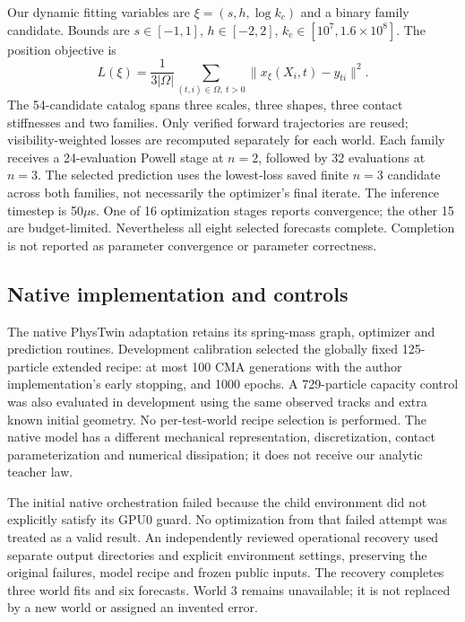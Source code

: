 \documentclass[10pt,twocolumn,letterpaper]{article}
\begin{document}
Our dynamic fitting variables are $\xi=(s,h,\log k_c)$ and a binary family candidate. Bounds are $s\in[-1,1]$, $h\in[-2,2]$, $k_c\in[10^7,1.6\times10^8]$. The position objective is
\begin{equation}
 L(\xi)=\frac{1}{3|\Omega|}\sum_{(t,i)\in\Omega,\ t>0}\|x_\xi(X_i,t)-y_{ti}\|^2.
\end{equation}
The 54-candidate catalog spans three scales, three shapes, three contact stiffnesses and two families. Only verified forward trajectories are reused; visibility-weighted losses are recomputed separately for each world. Each family receives a 24-evaluation Powell stage at $n=2$, followed by 32 evaluations at $n=3$. The selected prediction uses the lowest-loss saved finite $n=3$ candidate across both families, not necessarily the optimizer's final iterate. The inference timestep is 50$\mu$s. One of 16 optimization stages reports convergence; the other 15 are budget-limited. Nevertheless all eight selected forecasts complete. Completion is not reported as parameter convergence or parameter correctness.

\subsection{Native implementation and controls}
The native PhysTwin adaptation retains its spring-mass graph, optimizer and prediction routines. Development calibration selected the globally fixed 125-particle extended recipe: at most 100 CMA generations with the author implementation's early stopping, and 1000 epochs. A 729-particle capacity control was also evaluated in development using the same observed tracks and extra known initial geometry. No per-test-world recipe selection is performed. The native model has a different mechanical representation, discretization, contact parameterization and numerical dissipation; it does not receive our analytic teacher law.

The initial native orchestration failed because the child environment did not explicitly satisfy its GPU0 guard. No optimization from that failed attempt was treated as a valid result. An independently reviewed operational recovery used separate output directories and explicit environment settings, preserving the original failures, model recipe and frozen public inputs. The recovery completes three world fits and six forecasts. World 3 remains unavailable; it is not replaced by a new world or assigned an invented error.
\end{document}
